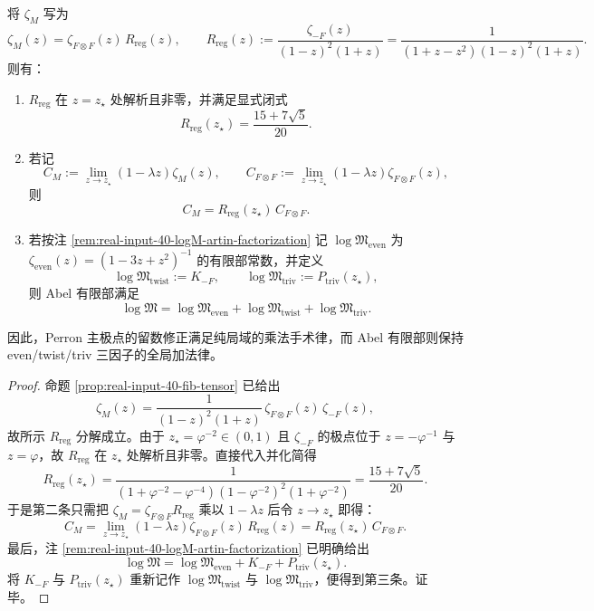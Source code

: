 \begin{theorem}\label{thm:conclusion-realinput40-perron-residue-local-surgery-finitepart-additivity}
将 \(\zeta_M\) 写为
\[
\zeta_M(z)=\zeta_{F\otimes F}(z)\,R_{\mathrm{reg}}(z),
\qquad
R_{\mathrm{reg}}(z):=\frac{\zeta_{-F}(z)}{(1-z)^2(1+z)}
=\frac{1}{(1+z-z^2)(1-z)^2(1+z)}.
\]
则有：
\begin{enumerate}
  \item \(R_{\mathrm{reg}}\) 在 \(z=z_\star\) 处解析且非零，并满足显式闭式
  \[
  R_{\mathrm{reg}}(z_\star)=\frac{15+7\sqrt5}{20}.
  \]
  \item 若记
  \[
  C_M:=\lim_{z\to z_\star}(1-\lambda z)\zeta_M(z),
  \qquad
  C_{F\otimes F}:=\lim_{z\to z_\star}(1-\lambda z)\zeta_{F\otimes F}(z),
  \]
  则
  \[
  C_M=R_{\mathrm{reg}}(z_\star)\,C_{F\otimes F}.
  \]
  \item 若按注 \ref{rem:real-input-40-logM-artin-factorization} 记 \(\log\mathfrak{M}_{\mathrm{even}}\) 为 \(\zeta_{\mathrm{even}}(z)=(1-3z+z^2)^{-1}\) 的有限部常数，并定义
  \[
  \log\mathfrak{M}_{\mathrm{twist}}:=K_{-F},
  \qquad
  \log\mathfrak{M}_{\mathrm{triv}}:=P_{\mathrm{triv}}(z_\star),
  \]
  则 Abel 有限部满足
  \[
  \log\mathfrak{M}
  =
  \log\mathfrak{M}_{\mathrm{even}}
  +\log\mathfrak{M}_{\mathrm{twist}}
  +\log\mathfrak{M}_{\mathrm{triv}}.
  \]
\end{enumerate}
因此，Perron 主极点的留数修正满足纯局域的乘法手术律，而 Abel 有限部则保持 even/twist/triv 三因子的全局加法律。
\end{theorem}
\begin{proof}
命题 \ref{prop:real-input-40-fib-tensor} 已给出
\[
\zeta_M(z)=\frac{1}{(1-z)^2(1+z)}\,\zeta_{F\otimes F}(z)\,\zeta_{-F}(z),
\]
故所示 \(R_{\mathrm{reg}}\) 分解成立。由于 \(z_\star=\varphi^{-2}\in(0,1)\) 且 \(\zeta_{-F}\) 的极点位于 \(z=-\varphi^{-1}\) 与 \(z=\varphi\)，故 \(R_{\mathrm{reg}}\) 在 \(z_\star\) 处解析且非零。直接代入并化简得
\[
R_{\mathrm{reg}}(z_\star)
=
\frac{1}{(1+\varphi^{-2}-\varphi^{-4})(1-\varphi^{-2})^2(1+\varphi^{-2})}
=
\frac{15+7\sqrt5}{20}.
\]
于是第二条只需把 \(\zeta_M=\zeta_{F\otimes F}R_{\mathrm{reg}}\) 乘以 \(1-\lambda z\) 后令 \(z\to z_\star\) 即得：
\[
C_M
=
\lim_{z\to z_\star}(1-\lambda z)\zeta_{F\otimes F}(z)\,R_{\mathrm{reg}}(z)
=
R_{\mathrm{reg}}(z_\star)\,C_{F\otimes F}.
\]
最后，注 \ref{rem:real-input-40-logM-artin-factorization} 已明确给出
\[
\log\mathfrak{M}
=
\log\mathfrak{M}_{\mathrm{even}}+K_{-F}+P_{\mathrm{triv}}(z_\star).
\]
将 \(K_{-F}\) 与 \(P_{\mathrm{triv}}(z_\star)\) 重新记作 \(\log\mathfrak{M}_{\mathrm{twist}}\) 与 \(\log\mathfrak{M}_{\mathrm{triv}}\)，便得到第三条。证毕。
\end{proof}
